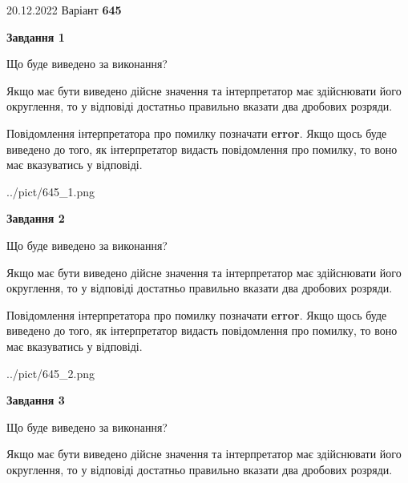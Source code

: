 \documentclass[12pt, ukrainian]{article}
\begin{document}
{20.12.2022 Варіант \No \textbf { 645 }\par}
{
\begin {Large}

{\begin {center}\textbf{Завдання 1}\end {center}}\par
Що буде виведено за виконання? \par

Якщо має бути виведено дійсне значення та інтерпретатор має здійснювати його округлення, 
то у відповіді достатньо правильно вказати два дробових розряди.

Повідомлення інтерпретатора про помилку позначати \textbf{error}.
Якщо щось буде виведено до того, як інтерпретатор видасть повідомлення про помилку, 
то воно має вказуватись у відповіді. \par

\begin{center}
	{../pict/645_1.png}
\end{center}
\newpage

{\begin {center}\textbf{Завдання 2}\end {center}}\par
Що буде виведено за виконання? \par

Якщо має бути виведено дійсне значення та інтерпретатор має здійснювати його округлення, 
то у відповіді достатньо правильно вказати два дробових розряди.

Повідомлення інтерпретатора про помилку позначати \textbf{error}.
Якщо щось буде виведено до того, як інтерпретатор видасть повідомлення про помилку, 
то воно має вказуватись у відповіді. \par

\begin{center}
	{../pict/645_2.png}
\end{center}
\newpage

{\begin {center}\textbf{Завдання 3}\end {center}}\par
Що буде виведено за виконання? \par

Якщо має бути виведено дійсне значення та інтерпретатор має здійснювати його округлення, 
то у відповіді достатньо правильно вказати два дробових розряди.


\end{Large}}
\end{document}
